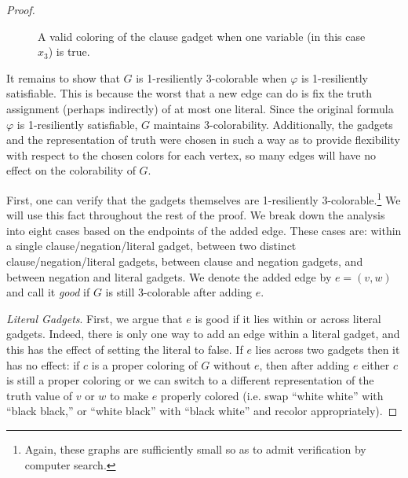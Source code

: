\documentclass[10pt]{article}
\begin{document}
\begin{proof}
\begin{figure}
\centering
{}
\caption{A valid coloring of the clause gadget when one variable (in this case $x_3$) is true.}
\label{fig:clause-gadget-proof}
\end{figure}

It remains to show that $G$ is 1-resiliently 3-colorable when $\varphi$ is
1-resiliently satisfiable. This is because the worst that a new edge can do is
fix the truth assignment (perhaps indirectly) of at most one literal. Since the
original formula $\varphi$ is 1-resiliently satisfiable, $G$ maintains
3-colorability.  Additionally, the gadgets and the representation of truth were
chosen in such a way as to provide flexibility with respect to the chosen colors
for each vertex, so many edges will have no effect on the colorability of $G$. 

First, one can verify that the gadgets themselves are 1-resiliently
3-colorable.\footnote{Again, these graphs are sufficiently small so as to admit
verification by computer search.} We will use this fact throughout the rest of
the proof. We break down the analysis into eight cases based on the endpoints of
the added edge. These cases are: within a single clause/negation/literal gadget,
between two distinct clause/negation/literal gadgets, between clause and
negation gadgets, and between negation and literal gadgets. We denote the added
edge by $e = (v,w)$ and call it \emph{good} if $G$ is still 3-colorable after
adding $e$. 

\emph{Literal Gadgets}. First, we argue that $e$ is good if it lies within or
across literal gadgets. Indeed, there is only one way to add an edge within a
literal gadget, and this has the effect of setting the literal to false. If $e$
lies across two gadgets then it has no effect: if $c$ is a proper coloring of
$G$ without $e$, then after adding $e$ either $c$ is still a proper coloring or
we can switch to a different representation of the truth value of $v$ or $w$ to
make $e$ properly colored (i.e. swap ``white white'' with ``black black,'' or
``white black'' with ``black white'' and recolor appropriately). 


\end{proof}
\end{document}
